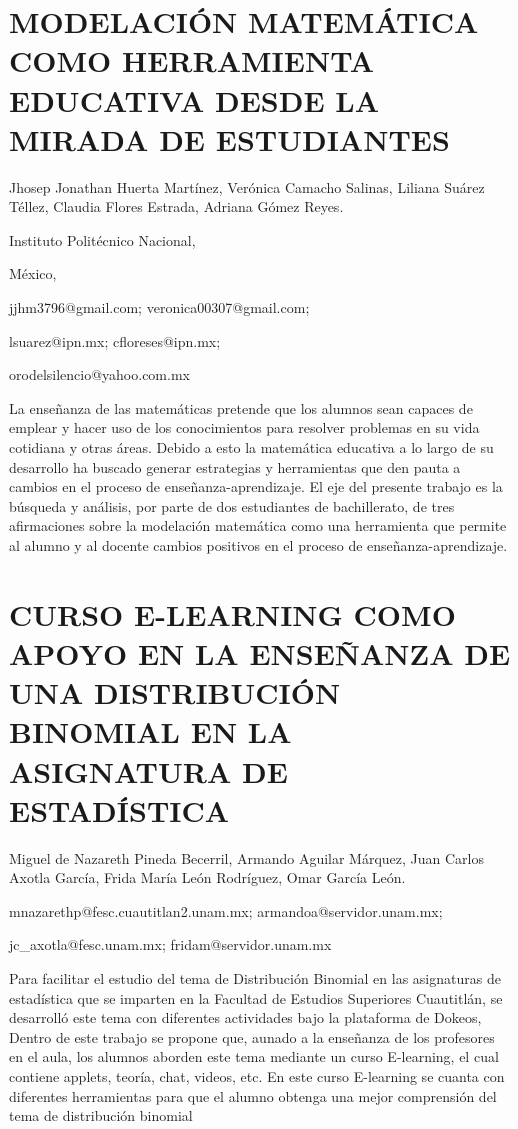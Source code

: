 \section{MODELACIÓN MATEMÁTICA COMO HERRAMIENTA EDUCATIVA DESDE LA MIRADA
DE ESTUDIANTES}

\begin{datos}

Jhosep Jonathan Huerta Martínez, Verónica Camacho Salinas, Liliana
Suárez Téllez, Claudia Flores Estrada, Adriana Gómez Reyes.

Instituto Politécnico Nacional,

México,

jjhm3796@gmail.com; veronica00307@gmail.com;

lsuarez@ipn.mx; cfloreses@ipn.mx;

orodelsilencio@yahoo.com.mx 

\end{datos}

La enseñanza de las matemáticas pretende que los alumnos sean capaces
de emplear y hacer uso de los conocimientos para resolver problemas
en su vida cotidiana y otras áreas. Debido a esto la matemática educativa
a lo largo de su desarrollo ha buscado generar estrategias y herramientas
que den pauta a cambios en el proceso de enseñanza-aprendizaje. El
eje del presente trabajo es la búsqueda y análisis, por parte de dos
estudiantes de bachillerato, de tres afirmaciones sobre la modelación
matemática como una herramienta que permite al alumno y al docente
cambios positivos en el proceso de enseñanza-aprendizaje.


\section{CURSO E-LEARNING COMO APOYO EN LA ENSEÑANZA DE UNA DISTRIBUCIÓN BINOMIAL
EN LA ASIGNATURA DE ESTADÍSTICA}

\begin{datos}

Miguel de Nazareth Pineda Becerril, Armando Aguilar Márquez, Juan
Carlos Axotla García, Frida María León Rodríguez, Omar García León.

mnazarethp@fesc.cuautitlan2.unam.mx; armandoa@servidor.unam.mx;

jc\_axotla@fesc.unam.mx; fridam@servidor.unam.mx

\end{datos}

Para facilitar el estudio del tema de Distribución Binomial en las
asignaturas de estadística que se imparten en la Facultad de Estudios
Superiores Cuautitlán, se desarrolló este tema con diferentes actividades
bajo la plataforma de Dokeos, Dentro de este trabajo se propone que,
aunado a la enseñanza de los profesores en el aula, los alumnos aborden
este tema mediante un curso E-learning, el cual contiene applets,
teoría, chat, videos, etc. En este curso E-learning se cuanta con
diferentes herramientas para que el alumno obtenga una mejor comprensión
del tema de distribución binomial 


